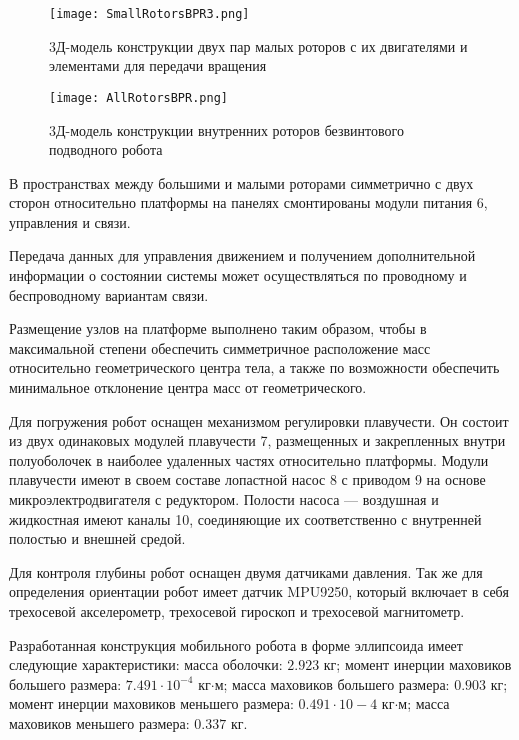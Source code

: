 \begin{figure}[h]
	\centering
	\texttt{[image: SmallRotorsBPR3.png]}%
	\caption{3Д-модель конструкции двух пар малых роторов с их двигателями и элементами для передачи вращения}
	\label{SmallRotorsBPR3}
\end{figure}

\begin{figure}[h]
	\centering
	\texttt{[image: AllRotorsBPR.png]}%
	\caption{3Д-модель конструкции внутренних роторов безвинтового подводного робота}
	\label{AllRotorsBPR}
\end{figure}



В пространствах между большими и малыми роторами симметрично с двух сторон относительно платформы на панелях смонтированы модули питания 6, управления и связи. 


Передача данных для управления движением и получением дополнительной информации о состоянии системы может осуществляться по проводному и беспроводному вариантам связи.

Размещение узлов на платформе выполнено таким образом, чтобы в максимальной степени обеспечить симметричное расположение масс относительно геометрического центра тела, а также по возможности обеспечить минимальное отклонение центра масс от геометрического.

Для погружения робот оснащен механизмом регулировки плавучести. Он состоит из двух одинаковых модулей плавучести 7, размещенных и закрепленных внутри полуоболочек в наиболее удаленных частях относительно платформы. Модули плавучести имеют в своем составе лопастной насос 8 с приводом 9 на основе микроэлектродвигателя с редуктором. Полости насоса --- воздушная и жидкостная имеют каналы 10, соединяющие их соответственно с внутренней полостью и внешней средой.

Для контроля глубины робот оснащен двумя датчиками давления. Так же для определения ориентации робот имеет датчик MPU9250, который включает в себя трехосевой акселерометр, трехосевой гироскоп и трехосевой магнитометр.


Разработанная конструкция мобильного робота в форме эллипсоида имеет следующие характеристики: масса оболочки: $2.923$ кг; момент инерции маховиков большего размера: $7.491\cdot10^{-4}$ кг$\cdot$м; масса маховиков большего размера: $0.903$ кг;	момент инерции маховиков меньшего размера: $0.491\cdot10-4$ кг$\cdot$м;	масса маховиков меньшего размера: $0.337$ кг.

